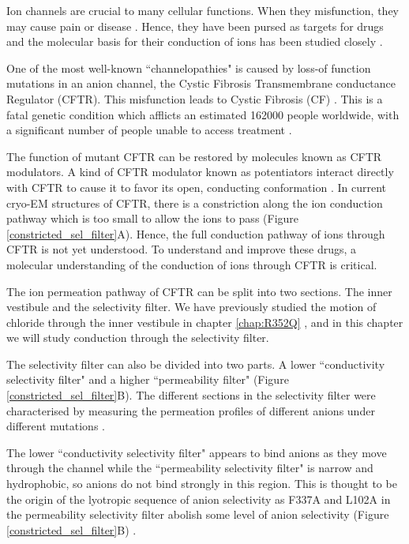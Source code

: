 Ion channels are crucial to many cellular functions. When they misfunction, they may cause pain or disease \cite{}. Hence, they have been pursed as targets for drugs and the molecular basis for their conduction of ions has been studied closely \cite{}.

One of the most well-known ``channelopathies" is caused by loss-of function mutations in an anion channel, the Cystic Fibrosis Transmembrane conductance Regulator (CFTR). This misfunction leads to Cystic Fibrosis (CF) \cite{riordan1989,gadsby2006}. This is a fatal genetic condition which afflicts an estimated 162000 people worldwide, with a significant number of people unable to access treatment \cite{guo2022}.

The function of mutant CFTR can be restored by molecules known as CFTR modulators. A kind of CFTR modulator known as potentiators interact directly with CFTR to cause it to favor its open, conducting conformation \cite{liu2019}. In current cryo-EM structures of CFTR, there is a constriction along the ion conduction pathway which is too small to allow the ions to pass \cite{zhang2018} (Figure \ref{constricted_sel_filter}A). Hence, the full conduction pathway of ions through CFTR is not yet understood. To understand and improve these drugs, a molecular understanding of the conduction of ions through CFTR is critical. 

The ion permeation pathway of CFTR can be split into two sections. The inner vestibule and the selectivity filter. We have previously studied the motion of chloride through the inner vestibule in chapter \ref{chap:R352Q} \cite{wong2022a}, and in this chapter we will study conduction through the selectivity filter.

The selectivity filter can also be divided into two parts. A lower ``conductivity selectivity filter" and a higher ``permeability filter" (Figure \ref{constricted_sel_filter}B). The different sections in the selectivity filter were characterised by measuring the permeation profiles of different anions under different mutations \cite{linsdell2016}. 

The lower ``conductivity selectivity filter" appears to bind anions as they move through the channel while the ``permeability selectivity filter" is narrow and hydrophobic, so anions do not bind strongly in this region. This is thought to be the origin of the lyotropic sequence of anion selectivity as F337A and L102A in the permeability selectivity filter abolish some level of anion selectivity (Figure \ref{constricted_sel_filter}B) \cite{linsdell2021}. 

